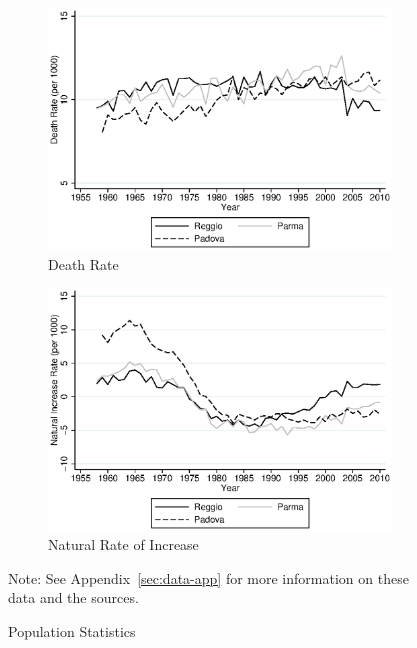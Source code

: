 \begin{figure}[H]
\begin{center}
\begin{subfigure}[t]{0.49\textwidth}
          \includegraphics[width=\textwidth]{output/image/death_rate.eps}
        \caption{Death Rate}
        \end{subfigure}
        \begin{subfigure}[t]{0.49\textwidth}
          \includegraphics[width=\textwidth]{output/image/naturalinc_rate.eps}
            \caption{Natural Rate of Increase}
        \end{subfigure}
      \caption{Population Statistics}  \label{fig:population}
      \end{center}
      \raggedright Note: See Appendix~\ref{sec:data-app} for more information on these data and the sources.
    \end{figure}

